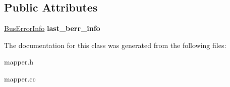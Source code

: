 \subsection*{Public Attributes}
\begin{DoxyCompactItemize}
\item 
\hypertarget{classMapper_a0a22497e194768c9324d2b91d5d4d5af}{
\hyperlink{structMapper_1_1BusErrorInfo}{BusErrorInfo} {\bfseries last\_\-berr\_\-info}}
\label{classMapper_a0a22497e194768c9324d2b91d5d4d5af}

\end{DoxyCompactItemize}


The documentation for this class was generated from the following files:\begin{DoxyCompactItemize}
\item 
mapper.h\item 
mapper.cc\end{DoxyCompactItemize}
